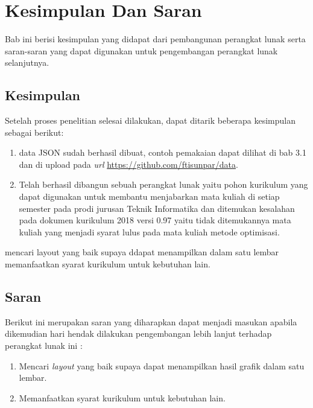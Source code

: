 \chapter{Kesimpulan Dan Saran}
\label{chap:Kesimpulan Dan Saran}

Bab ini berisi kesimpulan yang didapat dari pembangunan perangkat lunak serta saran-saran yang dapat digunakan
untuk pengembangan perangkat lunak selanjutnya.

\section{Kesimpulan}
\label{sec: Kesimpulan}

Setelah proses penelitian selesai dilakukan, dapat ditarik beberapa kesimpulan sebagai berikut:
\begin{enumerate}
\item data JSON sudah berhasil dibuat, contoh pemakaian dapat dilihat di bab 3.1 dan di upload pada \textit{url} \url{https://github.com/ftisunpar/data}.
\item Telah berhasil dibangun sebuah perangkat lunak yaitu pohon kurikulum yang dapat digunakan untuk membantu menjabarkan mata kuliah di setiap semester pada prodi jurusan Teknik Informatika dan ditemukan kesalahan pada dokumen kurikulum 2018 versi 0.97 yaitu tidak ditemukannya mata kuliah yang menjadi syarat lulus pada mata kuliah metode optimisasi.
\end{enumerate}


mencari layout yang baik supaya ddapat menampilkan dalam satu lembar
memanfaatkan syarat kurikulum untuk kebutuhan lain.


\section{Saran}
\label{sec: Saran}

Berikut ini merupakan saran yang diharapkan dapat menjadi masukan apabila dikemudian hari hendak dilakukan pengembangan lebih lanjut terhadap perangkat lunak ini :

\begin{enumerate}
	\item Mencari \textit{layout} yang baik supaya dapat menampilkan hasil grafik dalam satu lembar.
	\item Memanfaatkan syarat kurikulum untuk kebutuhan lain.

\end{enumerate}